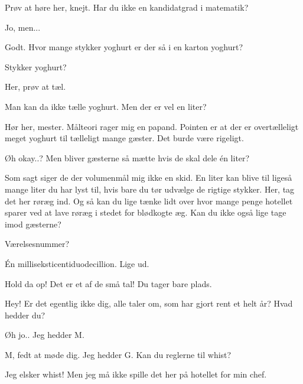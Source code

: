 \documentclass[a4paper,11pt]{article}
\begin{document}
\begin{sketch}
 Prøv at høre her, knejt. Har du ikke en kandidatgrad i matematik?

 Jo, men...

 Godt. Hvor mange stykker yoghurt er der så i en karton yoghurt?

 Stykker yoghurt?


 Her, prøv at tæl.

 Man kan da ikke tælle yoghurt. Men der er vel en liter?

 Hør her, mester. Målteori rager mig en papand. Pointen er at der er overtælleligt meget yoghurt til tælleligt mange gæster. Det burde være rigeligt.

 Øh okay..? Men bliver gæsterne så mætte hvis de skal dele én liter?

 Som sagt siger de der volumenmål mig ikke en skid. En liter kan blive til ligeså mange liter du har lyst til, hvis bare du tør udvælge de rigtige stykker. Her, tag det her røræg ind. Og så kan du lige tænke lidt over hvor mange penge hotellet sparer ved at lave røræg i stedet for blødkogte æg. Kan du ikke også lige tage imod gæsterne?


 Værelsesnummer?

 Én milliseksticentiduodecillion. Lige ud.

 Hold da op! Det er et af de små tal! Du tager bare plads.



 Hey! Er det egentlig ikke dig, alle taler om, som har gjort rent et helt år? Hvad hedder du?

 Øh jo.. Jeg hedder M.

 M, fedt at møde dig. Jeg hedder G. Kan du reglerne til whist?


 Jeg elsker whist! Men jeg må ikke spille det her på hotellet for min chef.


\end{sketch}
\end{document}
